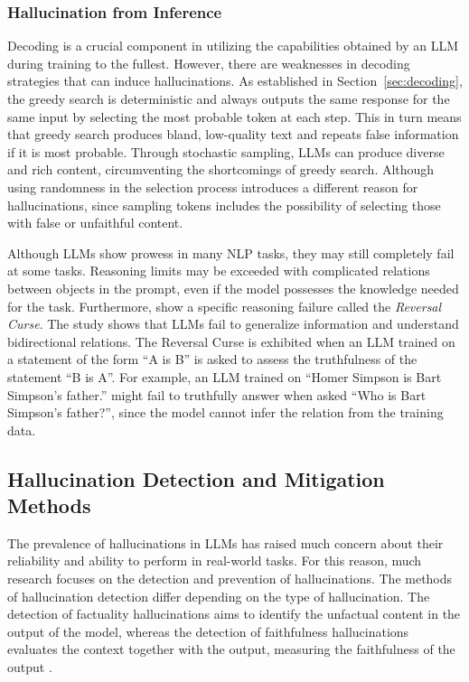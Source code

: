\documentclass[english, 12pt, a4paper, sci, utf8, a-2b, online]{latex/definitions/aaltothesis}
\begin{document}
\subsubsection{Hallucination from Inference} \label{sec:inference_hallucination}

Decoding is a crucial component in utilizing the capabilities obtained by an LLM during training to the fullest. However, there are weaknesses in decoding strategies that can induce hallucinations. As established in Section~\ref{sec:decoding}, the greedy search is deterministic and always outputs the same response for the same input by selecting the most probable token at each step. This in turn means that greedy search produces bland, low-quality text and repeats false information if it is most probable. Through stochastic sampling,  LLMs can produce diverse and rich content, circumventing the shortcomings of greedy search. Although using randomness in the selection process introduces a different reason for hallucinations, since sampling tokens includes the possibility of selecting those with false or unfaithful content.

Although LLMs show prowess in many NLP tasks, they may still completely fail at some tasks. Reasoning limits may be exceeded with complicated relations between objects in the prompt, even if the model possesses the knowledge needed for the task. Furthermore, \textcite{berglund2024reversalcursellmstrained} show a specific reasoning failure called the \textit{Reversal Curse}. The study shows that LLMs fail to generalize information and understand bidirectional relations. The Reversal Curse is exhibited when an LLM trained on a statement of the form ``A is B'' is asked to assess the truthfulness of the statement ``B is A''. For example, an LLM trained on ``Homer Simpson is Bart Simpson's father.'' might fail to truthfully answer when asked ``Who is Bart Simpson's father?'', since the model cannot infer the relation from the training data.  

\subsection{Hallucination Detection and Mitigation Methods} \label{sec:hall_mitigation}

The prevalence of hallucinations in LLMs has raised much concern about their reliability and ability to perform in real-world tasks. For this reason, much research focuses on the detection and prevention of hallucinations. The methods of hallucination detection differ depending on the type of hallucination. The detection of factuality hallucinations aims to identify the unfactual content in the output of the model, whereas the detection of faithfulness hallucinations evaluates the context together with the output, measuring the faithfulness of the output \cite{10.1145/3703155}. 
\end{document}
